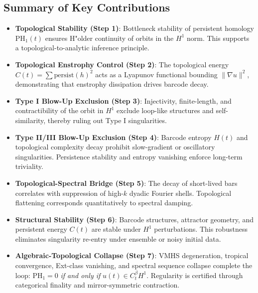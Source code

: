 \documentclass[11pt]{article}
\theoremstyle{definition}
\begin{document}
\subsection*{Summary of Key Contributions}

\begin{itemize}
    \item \textbf{Topological Stability (Step 1)}: Bottleneck stability of persistent homology $\mathrm{PH}_1(t)$ ensures H"older continuity of orbits in the $H^1$ norm. This supports a topological-to-analytic inference principle.

    \item \textbf{Topological Enstrophy Control (Step 2)}: The topological energy $C(t) = \sum \mathrm{persist}(h)^2$ acts as a Lyapunov functional bounding $\|\nabla u\|^2$, demonstrating that enstrophy dissipation drives barcode decay.

    \item \textbf{Type I Blow-Up Exclusion (Step 3)}: Injectivity, finite-length, and contractibility of the orbit in $H^1$ exclude loop-like structures and self-similarity, thereby ruling out Type I singularities.

    \item \textbf{Type II/III Blow-Up Exclusion (Step 4)}: Barcode entropy $H(t)$ and topological complexity decay prohibit slow-gradient or oscillatory singularities. Persistence stability and entropy vanishing enforce long-term triviality.

    \item \textbf{Topological-Spectral Bridge (Step 5)}: The decay of short-lived bars correlates with suppression of high-$k$ dyadic Fourier shells. Topological flattening corresponds quantitatively to spectral damping.

    \item \textbf{Structural Stability (Step 6)}: Barcode structures, attractor geometry, and persistent energy $C(t)$ are stable under $H^1$ perturbations. This robustness eliminates singularity re-entry under ensemble or noisy initial data.

    \item \textbf{Algebraic-Topological Collapse (Step 7)}: VMHS degeneration, tropical convergence, Ext-class vanishing, and spectral sequence collapse complete the loop: $\mathrm{PH}_1 = 0$ \textit{if and only if} $u(t) \in C_t^\beta H^1$. Regularity is certified through categorical finality and mirror-symmetric contraction.
\end{itemize}
\end{document}
